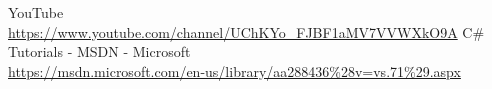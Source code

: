 \begin{thebibliography}{99999}
\singlespace\normalsize

YouTube\\\url{https://www.youtube.com/channel/UChKYo_FJBF1aMV7VVWXkO9A}
C\# Tutorials - MSDN - Microsoft\\
\url{https://msdn.microsoft.com/en-us/library/aa288436%28v=vs.71%29.aspx}
\end{thebibliography}
